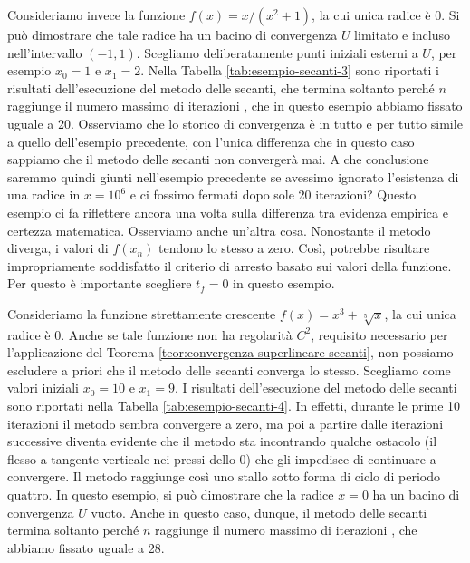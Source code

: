 \begin{esem}
Consideriamo invece la funzione $f(x) = x/(x^2+1)$, la cui unica radice è 0.
Si può dimostrare che tale radice ha un bacino di convergenza $U$ limitato
e incluso nell'intervallo $(-1,1)$.
Scegliamo deliberatamente punti iniziali esterni a $U$, per esempio
$x_0 = 1$ e $x_1 = 2$. Nella Tabella \ref{tab:esempio-secanti-3} sono
riportati i risultati dell'esecuzione del metodo delle secanti,
che termina soltanto perché $n$ raggiunge il numero massimo di iterazioni
, che in questo esempio abbiamo fissato uguale a 20.
Osserviamo che lo storico di convergenza è in tutto e per tutto
simile a quello dell'esempio precedente, con l'unica differenza che
in questo caso sappiamo che il metodo delle secanti non convergerà mai.
A che conclusione saremmo quindi giunti nell'esempio precedente
se avessimo ignorato l'esistenza di una radice in $x = 10^6$
e ci fossimo fermati dopo sole 20 iterazioni?
Questo esempio ci fa riflettere ancora una volta sulla
differenza tra evidenza empirica e certezza matematica.
Osserviamo anche un'altra cosa. Nonostante il metodo diverga,
i valori di $f(x_n)$ tendono lo stesso a zero.
Così, potrebbe risultare impropriamente soddisfatto il criterio
di arresto basato sui valori della funzione.
Per questo è importante scegliere $t_f = 0$ in questo esempio.
\end{esem}

\begin{esem}
Consideriamo la funzione strettamente crescente $f(x) = x^3 + \sqrt[5]{x}$,
la cui unica radice è 0.
Anche se tale funzione non ha regolarità $C^2$, requisito necessario
per l'applicazione del Teorema \ref{teor:convergenza-superlineare-secanti},
non possiamo escludere a priori che il metodo delle secanti converga lo stesso.
Scegliamo come valori iniziali $x_0 = 10$ e $x_1 = 9$.
I risultati dell'esecuzione del metodo delle secanti
sono riportati nella Tabella \ref{tab:esempio-secanti-4}.
In effetti, durante le prime 10 iterazioni il metodo sembra convergere a zero,
ma poi a partire dalle iterazioni successive diventa evidente che il metodo
sta incontrando qualche ostacolo (il flesso a tangente verticale
nei pressi dello 0) che gli impedisce di continuare a convergere.
Il metodo raggiunge così uno stallo sotto forma di ciclo di periodo
quattro.
In questo esempio, si può dimostrare che la radice $x = 0$ ha un bacino di
convergenza $U$ vuoto. Anche in questo caso, dunque, il metodo delle secanti
termina soltanto perché $n$ raggiunge il numero massimo di iterazioni
, che abbiamo fissato uguale a 28.
\end{esem}

